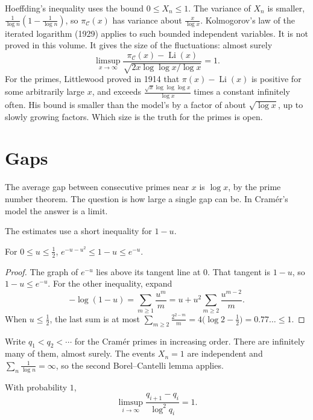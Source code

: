 \begin{remark}
Hoeffding's inequality uses the bound $0\le X_n\le1$. The variance of $X_n$ is smaller, $\frac1{\log n}(1-\frac1{\log n})$, so $\pi_{\mathcal C}(x)$ has variance about $\frac x{\log x}$. Kolmogorov's
law of the iterated logarithm (1929) applies to such bounded independent variables. It is not proved in this volume. It gives the size of the fluctuations: almost surely
\[
\limsup_{x\to\infty}\frac{\pi_{\mathcal C}(x)-\operatorname{Li}(x)}{\sqrt{2x\log\log x/\log x}}=1.
\]
For the primes, Littlewood proved in 1914 that $\pi(x)-\operatorname{Li}(x)$ is positive for some arbitrarily large $x$, and exceeds $\frac{\sqrt x\log\log\log x}{\log x}$ times a constant infinitely often.
His bound is smaller than the model's by a factor of about $\sqrt{\log x}$, up to slowly growing factors. Which size is the truth for the primes is open.
\end{remark}

\section{Gaps}

The average gap between consecutive primes near $x$ is $\log x$, by the prime number theorem. The question is how large a single gap can be. In Cramér's model the answer is a limit.

The estimates use a short inequality for $1-u$.

\begin{lemma}\label{lem:oneminus}
For $0\le u\le\frac12$, $e^{-u-u^2}\le1-u\le e^{-u}$.
\end{lemma}

\begin{proof}
The graph of $e^{-u}$ lies above its tangent line at $0$. That tangent is $1-u$, so $1-u\le e^{-u}$. For the other inequality, expand
\[
-\log(1-u)=\sum_{m\ge1}\frac{u^m}m=u+u^2\sum_{m\ge2}\frac{u^{m-2}}m.
\]
When $u\le\frac12$, the last sum is at most $\sum_{m\ge2}\frac{2^{2-m}}m=4\bigl(\log2-\frac12\bigr)=0.77\ldots\le1$.
\end{proof}

Write $q_1<q_2<\cdots$ for the Cramér primes in increasing order. There are infinitely many of them, almost surely. The events $X_n=1$ are independent and $\sum_n\frac1{\log n}=\infty$, so the second Borel--Cantelli lemma applies.

\begin{theorem}[Cramér, 1936]\label{thm:cramergaps}
With probability $1$,
\[
\limsup_{i\to\infty}\frac{q_{i+1}-q_i}{\log^2q_i}=1.
\]
\end{theorem}

